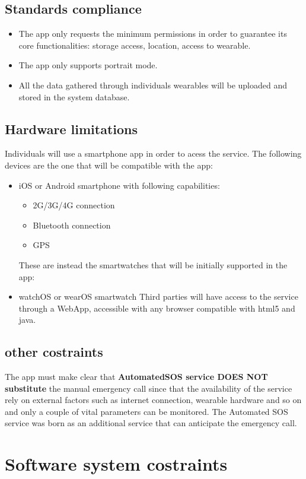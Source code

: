 \subsection{Standards compliance}
\begin{itemize}
\item The app only requests the minimum permissions in order to guarantee its core functionalities: storage access, location, access to wearable.
\item The app only supports portrait mode.
\item All the data gathered through individuals wearables will be uploaded and stored in the system database.
\end{itemize}


\subsection{Hardware limitations}
Individuals will use a smartphone app in order to acess the service.
The following devices are the one that will be compatible with the app:
\begin{itemize}
\item iOS or Android smartphone with following capabilities:
\begin{itemize}
\item 2G/3G/4G connection
\item Bluetooth connection
\item GPS
\end{itemize}
These are instead the smartwatches that will be initially supported in the app:
\item watchOS or wearOS smartwatch
\newline
Third parties will have access to the service through a WebApp, accessible with any browser compatible with html5 and java.
\end{itemize}

\subsection{other costraints}
The app must make clear that \textbf{AutomatedSOS service DOES NOT substitute} the manual emergency call since that the availability of the service rely on external factors such as internet connection, wearable hardware and so on and only a couple of vital parameters can be monitored.
The Automated SOS service was born as an additional service that can anticipate the emergency call.


\section{Software system costraints}
